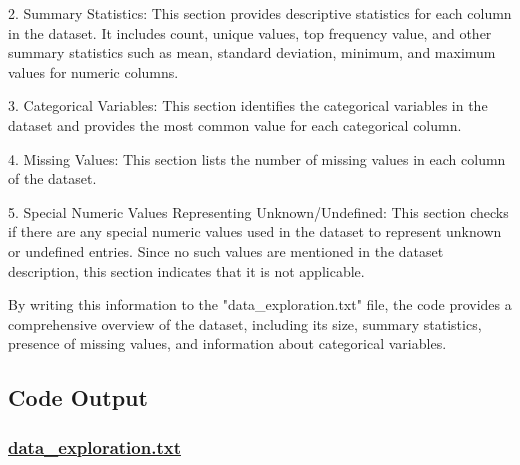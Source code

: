 \documentclass[11pt]{article}
\begin{document}
2. Summary Statistics: This section provides descriptive statistics for each column in the dataset. It includes count, unique values, top frequency value, and other summary statistics such as mean, standard deviation, minimum, and maximum values for numeric columns.

3. Categorical Variables: This section identifies the categorical variables in the dataset and provides the most common value for each categorical column.

4. Missing Values: This section lists the number of missing values in each column of the dataset.

5. Special Numeric Values Representing Unknown/Undefined: This section checks if there are any special numeric values used in the dataset to represent unknown or undefined entries. Since no such values are mentioned in the dataset description, this section indicates that it is not applicable.

By writing this information to the "data\_exploration.txt" file, the code provides a comprehensive overview of the dataset, including its size, summary statistics, presence of missing values, and information about categorical variables.

\subsection{Code Output}\hypertarget{file-data-exploration-txt}{}

\subsubsection*{\hyperlink{code-Data Exploration-data-exploration-txt}{data\_exploration.txt}}
\end{document}
